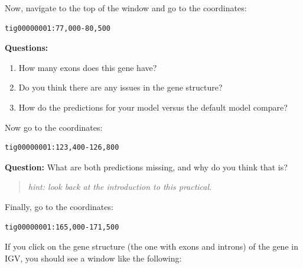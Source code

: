 \documentclass[11pt]{article}
\providecommand{\tightlist}{%
      \setlength{\itemsep}{0pt}\setlength{\parskip}{0pt}}
\begin{document}
Now, navigate to the top of the window and go to the coordinates:

\begin{verbatim}
tig00000001:77,000-80,500
\end{verbatim}

\textbf{Questions:}

\begin{enumerate}
\def\labelenumi{\arabic{enumi}.}
\tightlist
\item
  How many exons does this gene have?
\item
  Do you think there are any issues in the gene structure?
\item
  How do the predictions for your model versus the default model
  compare?
\end{enumerate}

Now go to the coordinates:

\begin{verbatim}
tig00000001:123,400-126,800
\end{verbatim}

\textbf{Question:} What are both predictions missing, and why do you
think that is?

\begin{quote}
\textit{hint: look back at the introduction to this practical.}
\end{quote}

Finally, go to the coordinates:

\begin{verbatim}
tig00000001:165,000-171,500
\end{verbatim}

If you click on the gene structure (the one with exons and introns) of
the gene in IGV, you should see a window like the following:
\end{document}
